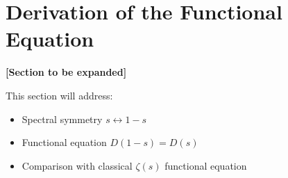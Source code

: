 \section{Derivation of the Functional Equation}
\label{sec:functional_equation}

\textbf{[Section to be expanded]}

This section will address:
\begin{itemize}
\item Spectral symmetry $s \leftrightarrow 1-s$
\item Functional equation $D(1-s) = D(s)$
\item Comparison with classical $\zeta(s)$ functional equation
\end{itemize}
